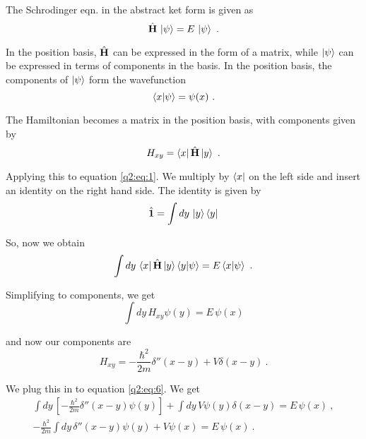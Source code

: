 
The Schrodinger eqn. in the abstract ket form is given as 
    \begin{equation} \label{q2:eq:1}
        \hat{\textbf{H}} \, \ket{\psi} = E\, \ket{\psi}~.
    \end{equation}

In the position basis, $\hat{\textbf{H}}$ can be expressed in the form of a matrix, while $\ket{\psi}$ can be expressed in terms of components in the basis.
In the position basis, the components of $\ket{\psi}$ form the wavefunction
    \begin{equation}
        \braket{x}{\psi} = \psi(x)~.
    \end{equation}

The Hamiltonian becomes a matrix in the position basis, with components given by 
    \begin{equation}
        H_{xy} = \bra{x}\hat{\textbf{H}}\ket{y}~.
    \end{equation}

Applying this to equation \ref{q2:eq:1}. We multiply by $\bra{x}$ on the left side and insert an identity on the right hand side.
The identity is given by 
    \begin{equation}
        \hat{\textbf{1}} = \int dy\, \ket{y}\bra{y}
    \end{equation}

So, now we obtain 
    \begin{equation}
        \int dy\, \bra{x}\hat{\textbf{H}}\ket{y}\braket{y}{\psi} = E \braket{x}{\psi}~.
    \end{equation}

Simplifying to components, we get 
    \begin{equation} \label{q2:eq:6}
        \int dy \, H_{xy} \psi(y) = E \, \psi(x)
    \end{equation}

and now our components are 
    \begin{equation}
        H_{xy} = -\frac{\hbar^2}{2m}\delta''(x-y) + V\delta(x-y)~.
    \end{equation}

We plug this in to equation \ref{q2:eq:6}. We get  
    \begin{gather}
        \int dy \, [-\frac{\hbar^2}{2m}\delta''(x-y) \psi(y)] + \int dy \, V\psi(y)\delta(x-y) = E \, \psi(x)~,
        \\- \frac{\hbar^2}{2m} \int dy \, \delta''(x-y) \psi(y) + V \psi(x) = E\,  \psi(x)~.        
    \end{gather}

